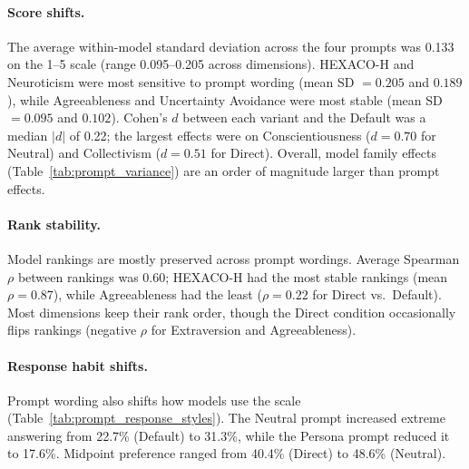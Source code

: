 \documentclass[11pt]{article}
\begin{document}
\paragraph{Score shifts.}
The average within-model standard deviation across the four prompts was 0.133 on the 1--5 scale (range 0.095--0.205 across dimensions).
HEXACO-H and Neuroticism were most sensitive to prompt wording (mean SD $= 0.205$ and $0.189$), while Agreeableness and Uncertainty Avoidance were most stable (mean SD $= 0.095$ and $0.102$).
Cohen's $d$ between each variant and the Default was a median $|d|$ of 0.22; the largest effects were on Conscientiousness ($d = 0.70$ for Neutral) and Collectivism ($d = 0.51$ for Direct).
Overall, model family effects (Table~\ref{tab:prompt_variance}) are an order of magnitude larger than prompt effects.

\paragraph{Rank stability.}
Model rankings are mostly preserved across prompt wordings.
Average Spearman $\rho$ between rankings was 0.60; HEXACO-H had the most stable rankings (mean $\rho = 0.87$), while Agreeableness had the least ($\rho = 0.22$ for Direct vs.\ Default).
Most dimensions keep their rank order, though the Direct condition occasionally flips rankings (negative $\rho$ for Extraversion and Agreeableness).

\paragraph{Response habit shifts.}
Prompt wording also shifts how models use the scale (Table~\ref{tab:prompt_response_styles}).
The Neutral prompt increased extreme answering from 22.7\% (Default) to 31.3\%, while the Persona prompt reduced it to 17.6\%.
Midpoint preference ranged from 40.4\% (Direct) to 48.6\% (Neutral).

\begin{table}[!htb]
\centering
\caption{Response style indicators across four prompt conditions, averaged over all 15 models. Mid.\ = proportion at 3; Ext.\ = proportion at 1 or 5.}
\label{tab:prompt_response_styles}
\end{table}
\end{document}
